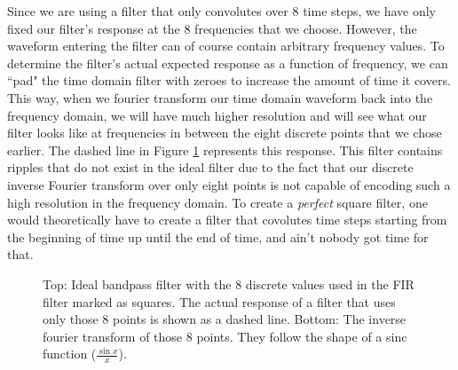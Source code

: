 \documentclass[12pt]{article}
\begin{document}
Since we are using a filter that only convolutes over 8 time steps, we have only fixed our filter's response at the 8 frequencies that we choose. However, the waveform entering the filter can of course contain arbitrary frequency values. To determine the filter's actual expected response as a function of frequency, we can ``pad" the time domain filter with zeroes to increase the amount of time it covers. This way, when we fourier transform our time domain waveform back into the frequency domain, we will have much higher resolution and will see what our filter looks like at frequencies in between the eight discrete points that we chose earlier. The dashed line in Figure \ref{fig:fir} represents this response. This filter contains ripples that do not exist in the ideal filter due to the fact that our discrete inverse Fourier transform over only eight points is not capable of encoding such a high resolution in the frequency domain. To create a \textit{perfect} square filter, one would theoretically have to create a filter that covolutes time steps starting from the beginning of time up until the end of time, and ain't nobody got time for that.
\begin{figure}[H]
  
\caption[SODUMB]{Top: Ideal bandpass filter with the 8 discrete values used in the FIR filter marked as squares. The actual response of a filter that uses only those 8 points is shown as a dashed line. Bottom: The inverse fourier transform of those 8 points. They follow the shape of a sinc function ($\frac{\sin{x}}{x}$).}
\label{fig:fir}
\end{figure}
\end{document}
